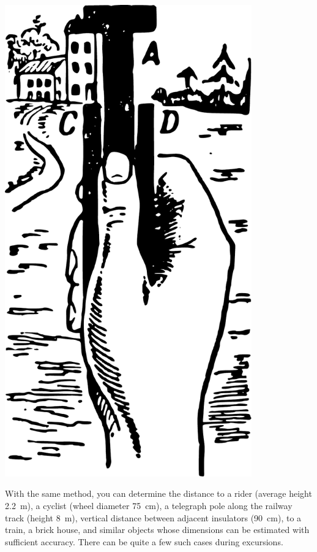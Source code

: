 \begin{marginfigure}[-3cm]%
\centering
\includegraphics[width=0.8\textwidth]{figures/ch-02/fig-039.pdf}
\end{marginfigure}

With the same method, you can determine the distance to a rider (average height \SI{2.2}{\meter}), a cyclist (wheel diameter \SI{75}{\centi\meter}), a telegraph pole along the railway track (height \SI{8}{\meter}), vertical distance between adjacent insulators (\SI{90}{\centi\meter}), to a train, a brick house, and similar objects whose dimensions can be estimated with sufficient accuracy. There can be quite a few such cases during excursions.



